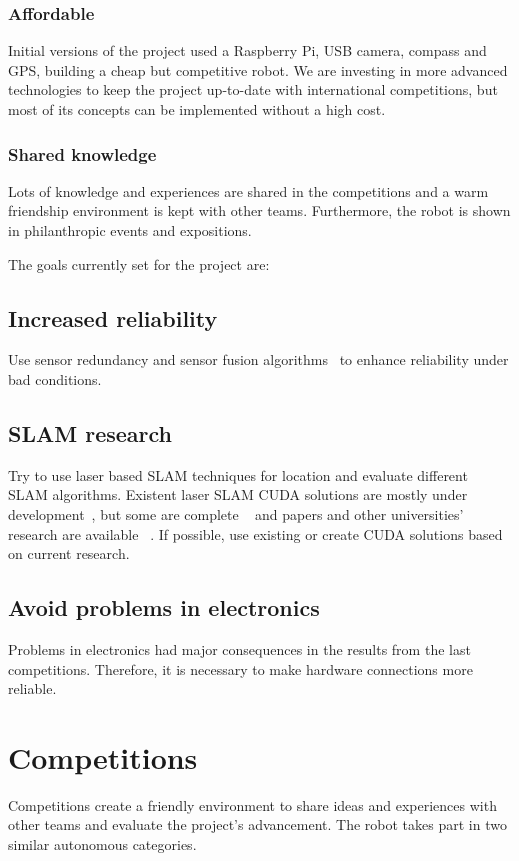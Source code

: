 \documentclass[conference]{IEEEtran}
\begin{document}
\subsubsection{Affordable}
Initial versions of the project used a Raspberry Pi, USB camera, compass and
GPS, building a cheap but competitive robot. We are investing in more advanced
technologies to keep the project up-to-date with international competitions, but
most of its concepts can be implemented without a high cost.
\subsubsection{Shared knowledge}
Lots of knowledge and experiences are shared in the competitions and a warm
friendship environment is kept with other teams. Furthermore, the robot is
shown in philanthropic events and expositions.

\medskip
The goals currently set for the project are:
\setcounter{subsection}{0}
\subsection{Increased reliability} Use sensor redundancy and sensor fusion
algorithms~\cite{kalman} to enhance reliability under bad conditions.
\subsection{SLAM research} Try to use laser based SLAM techniques for
location and evaluate different SLAM algorithms. Existent laser SLAM CUDA
solutions are mostly under development~\cite{CUDA-PHDSLAM}, but some are complete
~\cite{rgbdslam_v2} and papers and other universities' research are available
~\cite{CUDA-IEEE}. If possible, use existing or create CUDA solutions based on current
research.
\subsection{Avoid problems in electronics}  Problems in electronics had major consequences
in the results from the last competitions. Therefore, it is necessary to make hardware
connections more reliable.

\section{Competitions}
\setcounter{subsection}{0}
Competitions create a friendly environment to share ideas and experiences with
other teams and evaluate the project's advancement. The robot takes part in two
similar autonomous categories.
\end{document}
